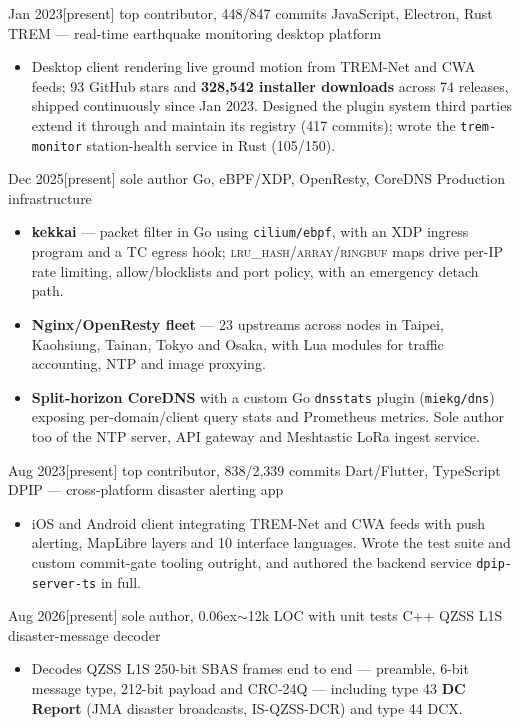 \documentclass{resume}
\begin{document}
\begin{projects}
  \project%
    {Jan 2023}[present]%
    {top contributor, 448/847 commits}%
    {JavaScript, Electron, Rust}%
    {TREM --- real-time earthquake monitoring desktop platform}%
    {\begin{itemize}
      \item Desktop client rendering live ground motion from TREM-Net and CWA feeds; 93 GitHub stars and
        \textbf{328,542 installer downloads} across 74 releases, shipped continuously since Jan 2023.
        Designed the plugin system third parties extend it through and maintain its registry (417 commits);
        wrote the \texttt{trem-monitor} station-health service in Rust (105/150).
    \end{itemize}}

  \project%
    {Dec 2025}[present]%
    {sole author}%
    {Go, eBPF/XDP, OpenResty, CoreDNS}%
    {Production infrastructure}%
    {\begin{itemize}
      \item \textbf{kekkai} --- packet filter in Go using \texttt{cilium/ebpf}, with an XDP ingress
        program and a TC egress hook; \textsc{lru\_hash}/\textsc{array}/\textsc{ringbuf} maps drive
        per-IP rate limiting, allow/blocklists and port policy, with an emergency detach path.
      \item \textbf{Nginx/OpenResty fleet} --- 23 upstreams across nodes in Taipei, Kaohsiung,
        Tainan, Tokyo and Osaka, with Lua modules for traffic accounting, NTP and image proxying.
      \item \textbf{Split-horizon CoreDNS} with a custom Go \texttt{dnsstats} plugin
        (\texttt{miekg/dns}) exposing per-domain/client query stats and Prometheus metrics. Sole author
        too of the NTP server, API gateway and Meshtastic LoRa ingest service.
    \end{itemize}}

  \project%
    {Aug 2023}[present]%
    {top contributor, 838/2,339 commits}%
    {Dart/Flutter, TypeScript}%
    {DPIP --- cross-platform disaster alerting app}%
    {\begin{itemize}
      \item iOS and Android client integrating TREM-Net and CWA feeds with push alerting, MapLibre layers
        and 10 interface languages. Wrote the test suite and custom commit-gate tooling outright, and
        authored the backend service \texttt{dpip-server-ts} in full.
    \end{itemize}}

  \project%
    {Aug 2026}[present]%
    {sole author, {\raise0.06ex\hbox{$\sim$}}12k LOC with unit tests}%
    {C++}%
    {QZSS L1S disaster-message decoder}%
    {\begin{itemize}
      \item Decodes QZSS L1S 250-bit SBAS frames end to end --- preamble, 6-bit message type,
        212-bit payload and CRC-24Q --- including type 43 \textbf{DC Report} (JMA disaster
        broadcasts, IS-QZSS-DCR) and type 44 DCX.
    \end{itemize}}
\end{projects}
\end{document}
